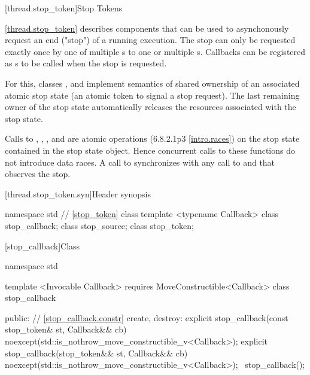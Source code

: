 {\color{insertcolor}

[thread.stop_token]{Stop Tokens}

\pnum
\ref{thread.stop_token} describes components that can be used to
asynchonously request an end ("stop") of a running execution.
The stop can only be requested exactly once
by one of multiple s to one or multiple s.
Callbacks can be registered as s to be called when the stop is requested.

For this, classes ,  and  implement
semantics of shared ownership of an associated atomic stop state (an atomic token to signal a stop request).
The last remaining owner of the stop state automatically 
releases the resources associated with the stop state.

\pnum
Calls to , ,
, and 
are atomic operations (6.8.2.1p3 \ref{intro.races})
on the stop state contained in the stop state object.
Hence concurrent calls to these functions do not introduce data races. 
A call to  synchronizes with any call to  and
 that observes the stop.

[thread.stop_token.syn]{Header  synopsis}
%

\begin{codeblock}
namespace std {
  // \ref{stop_token} class 
  template <typename Callback> class stop_callback;
  class stop_source;
  class stop_token;
}
\end{codeblock}


%
[stop_callback]{Class }

\pnum
{}%

\begin{codeblock}
namespace std {
  template <Invocable Callback>
    requires MoveConstructible<Callback>
  class stop_callback {
  public:
    // \ref{stop_callback.constr} create, destroy:
    explicit stop_callback(const stop_token& st, Callback&& cb)
        noexcept(std::is_nothrow_move_constructible_v<Callback>);
    explicit stop_callback(stop_token&& st, Callback&& cb)
        noexcept(std::is_nothrow_move_constructible_v<Callback>);
    ~stop_callback();

}}
\end{codeblock}}
